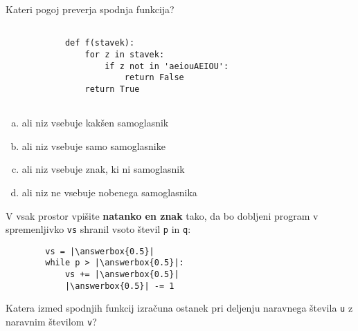 \documentclass[arhiv, 10pt]{../izpit}
\newcommand{\inlinepy}[1]{\texttt{#1}}
\newcommand{\answerbox}[1]{\framebox{\vphantom{\large M}\hspace{#1cm}}}
\begin{document}
        \naloga*

        \begin{multicols}{2}
        \noindent
        Kateri pogoj preverja spodnja funkcija?
        \begin{verbatim}
        
            def f(stavek):
                for z in stavek:
                    if z not in 'aeiouAEIOU':
                        return False
                return True
            
        \end{verbatim}

        \begin{enumerate}[(a)]
\item ali niz vsebuje kakšen samoglasnik
\item ali niz vsebuje samo samoglasnike
\item ali niz vsebuje znak, ki ni samoglasnik
\item ali niz ne vsebuje nobenega samoglasnika
\end{enumerate}

        \end{multicols}
    
        \naloga*
        \begin{multicols}{2}
        \noindent
        V vsak prostor vpišite \textbf{natanko en znak} tako, da bo dobljeni program v spremenljivko \inlinepy{vs} shranil vsoto števil \inlinepy{p} in \inlinepy{q}:
        
        \columnbreak
        \begin{verbatim}
        vs = |\answerbox{0.5}|
        while p > |\answerbox{0.5}|:
            vs += |\answerbox{0.5}|
            |\answerbox{0.5}| -= 1
        \end{verbatim}
        \end{multicols}
    
        \clearpage
        \naloga
        
        Katera izmed spodnjih funkcij izračuna ostanek pri deljenju naravnega števila \inlinepy{u} z naravnim številom \inlinepy{v}?
    
\end{document}

